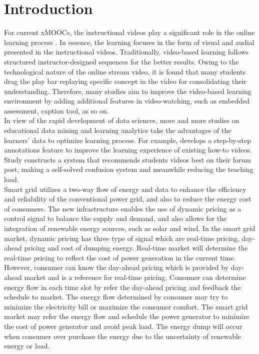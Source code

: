 \chapter{Introduction}

For current xMOOCs, the instructional videos play a significant role in the online learning process \cite{breslow:2013,seaton2014}.
In essence, the learning focuses in the form of visual and audial presented in the instructional videos.
Traditionally, video-based learning follows structured instructor-designed sequences for the better results.
Owing to the technological nature of the online stream video, it is found that many students drag the play bar replaying specific concept in the video for consolidating their understanding.
Therefore, many studies aim to improve the video-based learning environment by adding additional features in video-watching, such as embedded assessment, caption tool, as so on.
\\
In view of the rapid development of data sciences,
more and more studies on educational data mining and learning analytics take the advantages of the learners’ data to optimize learning process.
For example, \cite{kim2014} develops a step-by-step annotations feature to improve the learning experience of existing how-to videos.
Study \cite{agrawal2015} constructs a system that recommends students videos best on their forum post, making a self-solved confusion system and meanwhile reducing the teaching load. 
\\
Smart grid \cite{liu:2013} utilizes a two-way flow of energy and data to enhance the efficiency and reliability of the conventional power grid, and also to reduce the energy cost of consumers.
The new infrastructure enables the use of dynamic pricing \cite{king:2001,chen:2013,allcott:2011} as a control signal to balance the supply and demand, and also allows for the integration of renewable energy sources, such as solar and wind.
In the smart grid market, dynamic pricing has three type of signal which are real-time pricing, day-ahead pricing and cost of dumping energy. Real-time market will determine the real-time pricing to reflect the cost of power generation in the current time. However, consumer can know the day-ahead pricing which is provided by day-ahead market and is a reference for real-time pricing. Consumer can determine energy flow in each time slot by refer the day-ahead pricing and feedback the schedule to market. The energy flow determined by consumer may try to minimize the electricity bill or maximize the consumer comfort. The smart grid market may refer the energy flow and schedule the power generator to minimize the cost of power generator and avoid peak load. The energy dump will occur when consumer over purchase the energy due to the uncertainty of renewable energy or load.

